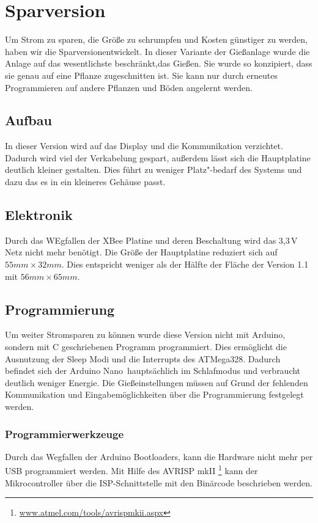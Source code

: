 
\section{Sparversion}
	Um Strom zu sparen, die Größe zu schrumpfen und Kosten günstiger zu werden, haben wir die \glqq Sparversion\grqq entwickelt.
	In dieser Variante der Gießanlage wurde die Anlage auf das wesentlichste beschränkt,das Gießen.
	Sie wurde so konzipiert, dass sie genau auf eine Pflanze zugeschnitten ist.
	Sie kann nur durch erneutes Programmieren auf andere Pflanzen und Böden angelernt werden. 	
	\subsection{Aufbau}
	In dieser Version wird auf das Display und die Kommunikation verzichtet.
	Dadurch wird viel der Verkabelung gespart, außerdem lässt sich die Hauptplatine deutlich kleiner gestalten.
	Dies führt zu weniger Platz"-bedarf des Systems und dazu das es in ein kleineres Gehäuse passt.
	\subsection{Elektronik}
	Durch das WEgfallen der XBee Platine und deren Beschaltung wird das 3,3\,V Netz nicht mehr benötigt.
	Die Größe der Hauptplatine  reduziert sich auf \begin{math} 55 mm \times 32 mm \end{math}.
	Dies entspricht weniger als der Hälfte der Fläche der Version 1.1 mit \begin{math} 56 mm \times 65 mm \end{math}.
	\subsection{Programmierung}
	Um weiter Stromsparen zu können wurde diese Version nicht mit Arduino, sondern mit C geschriebenen Programm programmiert.
	Dies ermöglicht die Ausnutzung der Sleep Modi und die Interrupts des ATMega328. 
	Dadurch befindet sich der \glqq Arduino Nano\grqq \ hauptsächlich im Schlafmodus und verbraucht deutlich weniger Energie.
	Die Gießeinstellungen müssen auf Grund der fehlenden Kommunikation und Eingabemöglichkeiten über die Programmierung festgelegt werden.
	\subsubsection{Programmierwerkzeuge}
	Durch das Wegfallen der Arduino Bootloaders, kann die Hardware nicht mehr per USB programmiert werden. 
	Mit Hilfe des AVRISP mkII \footnote{\href{http://www.atmel.com/tools/avrispmkii.aspx}{www.atmel.com/tools/avrispmkii.aspx}} kann der Mikrocontroller über die ISP-Schnittstelle mit den Binärcode beschrieben werden. 

